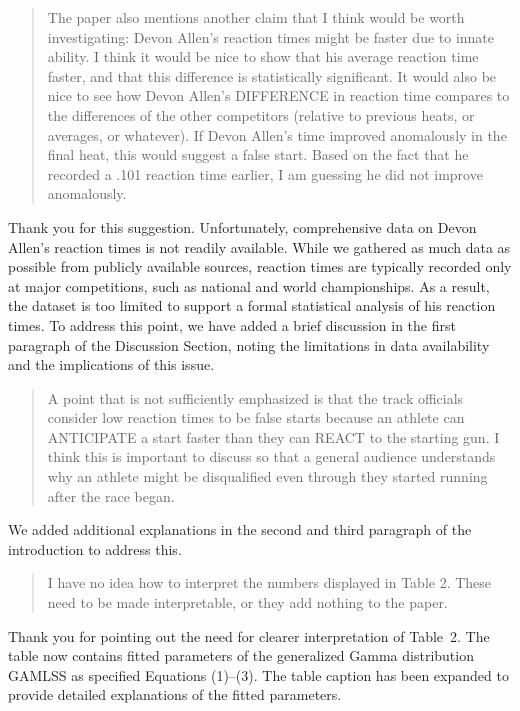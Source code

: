 \documentclass[12pt]{article}
\newenvironment{comment}%
{\begin{quotation}\noindent\small\it\color{darkblue}\ignorespaces%
}{\end{quotation}}
\begin{document}
\begin{comment}
The paper also mentions another claim that I think would be worth investigating:
Devon Allen’s reaction times might be faster due to innate ability. I think it
would be nice to show that his average reaction time faster, and that this
difference is statistically significant. It would also be nice to see how Devon
Allen’s DIFFERENCE in reaction time compares to the differences of the other
competitors (relative to previous heats, or averages, or whatever). If Devon
Allen’s time improved anomalously in the final heat, this would suggest a false
start. Based on the fact that he recorded a .101 reaction time earlier, I am
guessing he did not improve anomalously.
\end{comment}


Thank you for this suggestion. Unfortunately, comprehensive data on 
Devon Allen’s reaction times is not readily available. While we gathered 
as much data as possible from publicly available sources, reaction times 
are typically recorded only at major competitions, such as national and 
world championships. As a result, the dataset is too limited to support 
a formal statistical analysis of his reaction times.
To address this point, we have added a brief discussion in the first 
paragraph of the Discussion Section, noting the limitations in data 
availability and the implications of this issue.


\begin{comment}
A point that is not sufficiently emphasized is that the track officials consider
low reaction times to be false starts because an athlete can ANTICIPATE a start
faster than they can REACT to the starting gun. I think this is important to
discuss so that a general audience understands why an athlete might be
disqualified even through they started running after the race began.
\end{comment}

We added additional explanations in the second and third paragraph of the
introduction to address this.


\begin{comment}
I have no idea how to interpret the numbers displayed in Table 2. These
need to be made interpretable, or they add nothing to the paper.
\end{comment}

Thank you for pointing out the need for clearer interpretation of
Table~2. The table now contains fitted parameters of the generalized Gamma
distribution GAMLSS as specified Equations (1)--(3). The table caption has been
expanded to provide detailed explanations of the fitted parameters.
\end{document}
